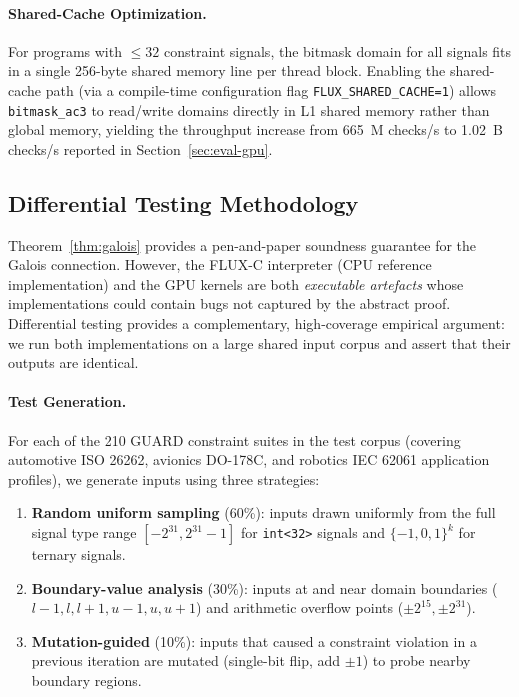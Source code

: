 \documentclass[conference]{IEEEtran}
\begin{document}
\paragraph{Shared-Cache Optimization.}
For programs with $\le 32$ constraint signals, the bitmask domain for all
signals fits in a single 256-byte shared memory line per thread block.
Enabling the shared-cache path (via a compile-time configuration flag
\texttt{FLUX\_SHARED\_CACHE=1}) allows \texttt{bitmask\_ac3} to read/write
domains directly in L1 shared memory rather than global memory, yielding
the throughput increase from 665~M checks/s to 1.02~B checks/s reported
in Section~\ref{sec:eval-gpu}.

\subsection{Differential Testing Methodology}
\label{sec:difftest}

Theorem~\ref{thm:galois} provides a pen-and-paper soundness guarantee for
the Galois connection. However, the FLUX-C interpreter (CPU reference
implementation) and the GPU kernels are both \emph{executable artefacts}
whose implementations could contain bugs not captured by the abstract proof.
Differential testing provides a complementary, high-coverage empirical
argument: we run both implementations on a large shared input corpus and
assert that their outputs are identical.

\paragraph{Test Generation.}
For each of the 210 GUARD constraint suites in the test corpus
(covering automotive ISO 26262, avionics DO-178C, and robotics IEC 62061
application profiles), we generate inputs using three strategies:
\begin{enumerate}
  \item \textbf{Random uniform sampling} (60\%): inputs drawn uniformly
        from the full signal type range $[-2^{31}, 2^{31}-1]$ for
        \texttt{int<32>} signals and $\{-1, 0, 1\}^k$ for ternary signals.
  \item \textbf{Boundary-value analysis} (30\%): inputs at and near domain
        boundaries ($l-1, l, l+1, u-1, u, u+1$) and arithmetic overflow
        points ($\pm 2^{15}, \pm 2^{31}$).
  \item \textbf{Mutation-guided} (10\%): inputs that caused a constraint
        violation in a previous iteration are mutated (single-bit flip, add
        $\pm 1$) to probe nearby boundary regions.
\end{enumerate}
\end{document}
